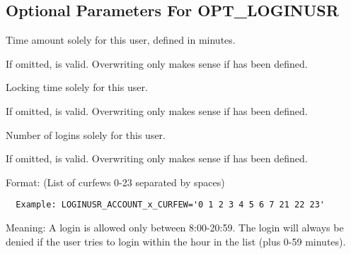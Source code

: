 \subsection {Optional Parameters For OPT\_LOGINUSR}

\begin{description}



  Time amount solely for this user, defined in minutes.

  If omitted,  is valid.
  Overwriting only makes sense if  has been defined.



  Locking time solely for this user.

  If omitted,  is valid.
  Overwriting only makes sense if
   has been defined.



  Number of logins solely for this user.

  If omitted,  is valid.
  Overwriting only makes sense if
   has been defined.



   Format: (List of curfews 0-23 separated by spaces)
  \begin{example}
  \begin{verbatim}
  Example: LOGINUSR_ACCOUNT_x_CURFEW='0 1 2 3 4 5 6 7 21 22 23'
  \end{verbatim}
  \end{example}
  Meaning: A login is allowed only between 8:00-20:59. The login will always be denied if the user tries
  to login within the hour in the list (plus 0-59 minutes).


\end{description}
